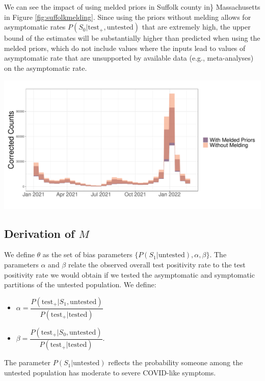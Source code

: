 \documentclass[12pt,twoside]{smiththesis}
\providecommand{\tightlist}{%
  \setlength{\itemsep}{0pt}\setlength{\parskip}{0pt}}
\begin{document}
We can see the impact of using melded priors in Suffolk county in\} Massachusetts in Figure \ref{fig:suffolkmelding}. Since using the priors without melding allows for asymptomatic rates \(P(S_0|\text{test}_+,\text{untested})\) that are extremely high, the upper bound of the estimates will be substantially higher than predicted when using the melded priors, which do not include values where the inputs lead to values of asymptomatic rate that are unsupported by available data (e.g., meta-analyses) on the asymptomatic rate.
\begin{center}\includegraphics[width=1\linewidth]{figure/suffolk_bayesian_melding} \end{center}

\hypertarget{derivation}{%
\subsection{\texorpdfstring{Derivation of \(M\)}{Derivation of M}}\label{derivation}}

\indent We define \(\theta\) as the set of bias parameters \(\{P(S_1|\text{untested}), \alpha, \beta \}\). The parameters \(\alpha\) and \(\beta\) relate the observed overall test positivity rate to the test positivity rate we would obtain if we tested the asymptomatic and symptomatic partitions of the untested population. We define:
\begin{itemize}
\tightlist
\item
  \(\alpha = \dfrac{P(\text{test}_+|S_1,\text{untested})}{P(\text{test}_+|\text{tested})}\)
\item
  \(\beta = \dfrac{P(\text{test}_+|S_0,\text{untested})}{P(\text{test}_+|\text{tested})}\).
\end{itemize}
The parameter \(P(S_1|\text{untested})\) reflects the probability someone among the untested population has moderate to severe COVID-like symptoms.
\end{document}
